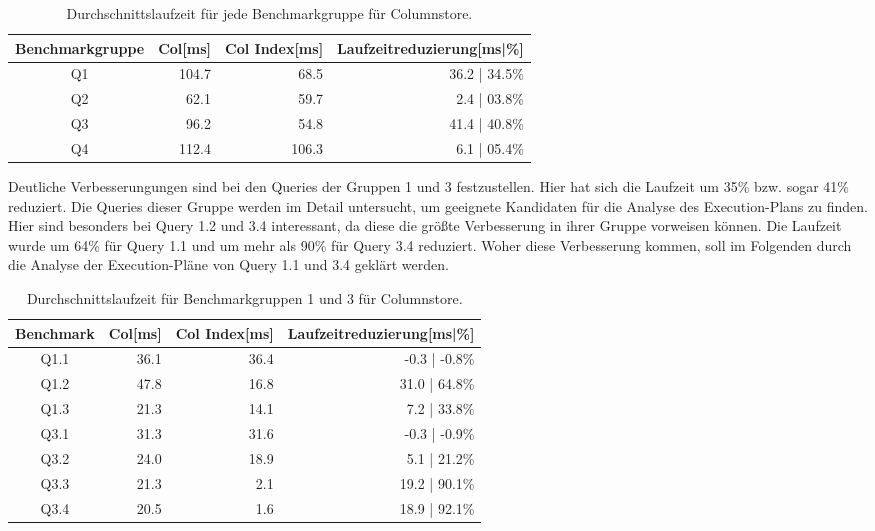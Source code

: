 \begin{table}[H]
    \centering
    \begin{tabularx}{\linewidth}{crrr}
        \toprule
        Benchmarkgruppe & Col[ms]   & Col Index[ms] & Laufzeitreduzierung[ms|\%]\\
        \toprule
        Q1              & 104.7       & 68.5            & 36.2 | 34.5\%\\
        Q2              & 62.1        & 59.7            & 2.4 |  03.8\%\\
        Q3              & 96.2        & 54.8            & 41.4 | 40.8\%\\
        Q4              & 112.4       & 106.3           & 6.1 |  05.4\%\\
        \bottomrule
    \end{tabularx}
	\caption{Durchschnittslaufzeit für jede Benchmarkgruppe für Columnstore.}
\end{table}

Deutliche Verbesserungungen sind bei den Queries der Gruppen 1 und 3 festzustellen. Hier hat sich die Laufzeit um 35\% bzw. sogar 41\% reduziert. 
Die Queries dieser Gruppe werden im Detail untersucht, um geeignete Kandidaten für die Analyse des Execution-Plans zu finden.
Hier sind besonders bei Query 1.2 und 3.4 interessant, da diese die größte Verbesserung in ihrer Gruppe vorweisen können. 
Die Laufzeit wurde um 64\% für Query 1.1 und um mehr als 90\% für Query 3.4 reduziert. Woher diese Verbesserung kommen, soll im Folgenden durch die Analyse der Execution-Pläne von Query 1.1 und 3.4 geklärt werden.


\begin{table}[H]
    \centering
    \begin{tabularx}{\linewidth}{crrr}
        \toprule
        Benchmark           & Col[ms]       & Col Index[ms] & Laufzeitreduzierung[ms|\%]   \\
        \toprule
        Q1.1                & 36.1          & 36.4          & -0.3 | -0.8\%                \\
        Q1.2                & 47.8          & 16.8          & 31.0 | 64.8\%                 \\
        Q1.3                & 21.3          & 14.1          & 7.2 | 33.8\%                \\
        \midrule
        Q3.1                & 31.3          & 31.6          & -0.3 | -0.9\%                \\
        Q3.2                & 24.0          & 18.9          & 5.1 | 21.2\%                 \\
        Q3.3                & 21.3          & 2.1           & 19.2 | 90.1\%                \\
        Q3.4                & 20.5          & 1.6           & 18.9 | 92.1\%                \\
        \bottomrule
    \end{tabularx}
\caption{Durchschnittslaufzeit für Benchmarkgruppen 1 und 3 für Columnstore.}
\label{tab:q1_q3_col}
\end{table}

